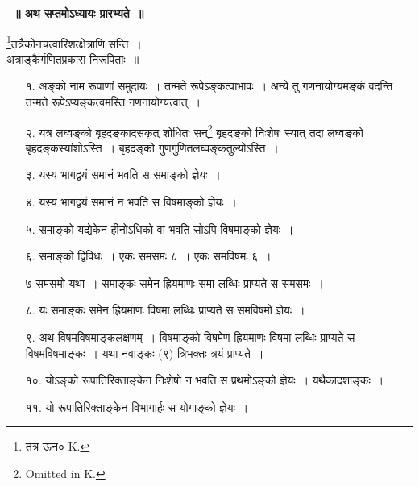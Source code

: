 \documentclass[11pt, openany]{book}
\makeatletter
\newcommand{\devanagarinumeral}[1]{%
	\devanagaridigits{\number \csname c@#1\endcsname}} %
\makeatother
\begin{document}
\afterpage{\fancyhead[LE,RO]{\thepage}}
\cfoot{}
\newpage
\renewcommand{\thepage}{\devanagarinumeral{page}}
\setcounter{page}{1}
\newpage
\thispagestyle{empty}
 \label{ch7}
\begin{center}
{\bf \LARGE~॥ अथ सप्तमोऽध्यायः प्रारभ्यते~॥}\\
\vspace{6mm}

{\large \renewcommand{\thefootnote}{१}\footnote{तत्र ऊन० {\en K.}}तत्रैकोनचत्वारिंशत्क्षेत्राणि सन्ति~।}\\

\vspace{6mm}
{\LARGE अत्राङ्कैर्गणितप्रकारा निरूपिताः~॥}
\end{center}
\vspace{1mm}

\begin{enumerate}
\item[१.] अङ्को नाम रूपाणां समुदायः~। तन्मते रूपेऽङ्कत्वाभावः~। अन्ये तु गणनायोग्यमङ्कं वदन्ति तन्मते रूपेऽप्यङ्कत्वमस्ति गणनायोग्यत्वात्~। 
\item[२.]यत्र लघ्वङ्को बृहदङ्कादसकृत् शोधितः सन्\renewcommand{\thefootnote}{२}\footnote{{\en Omitted in K.}} बृहदङ्को निःशेषः स्यात् तदा लघ्वङ्को बृहदङ्कस्यांशोऽस्ति~। बृहदङ्को गुणगुणितलघ्वङ्कतुल्योऽस्ति~। 
\item[३.]यस्य भागद्वयं समानं भवति स समाङ्को ज्ञेयः~। 
\item[४.] यस्य भागद्वयं समानं न भवति स विषमाङ्को ज्ञेयः~। 
\item[५.] समाङ्को यद्येकेन हीनोऽधिको वा भवति सोऽपि विषमाङ्को ज्ञेयः~। 
\item[६.] समाङ्को द्विविधः~। एकः समसमः ८~। एकः समविषमः ६~। 
\item[७] समसमो यथा~। समाङ्कः समेन ह्रियमाणः समा लब्धिः प्राप्यते स समसमः~। 
\item[८.] यः समाङ्कः समेन ह्रियमाणः विषमा लब्धिः प्राप्यते स समविषमो ज्ञेयः~। 
\item[९.] अथ विषमविषमाङ्कलक्षणम्~। विषमाङ्को विषमेण ह्रियमाणः विषमा लब्धिः प्राप्यते स विषमविषमाङ्कः~। यथा नवाङ्कः (९) त्रिभक्तः त्रयं प्राप्यते~। 
\item[१०.] योऽङ्को रूपातिरिक्ताङ्केन निःशेषो न भवति स प्रथमोऽङ्को ज्ञेयः~। यथैकादशाङ्कः~।  
\item[११.] यो रूपातिरिक्ताङ्केन विभागार्हः स योगाङ्को ज्ञेयः~।  
\end{enumerate}
\end{document}
